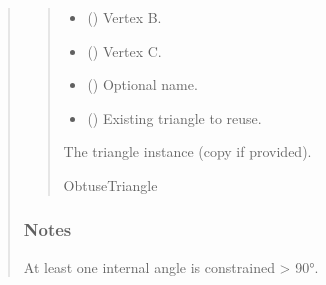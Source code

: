 \documentclass[letterpaper,10pt,english]{sphinxmanual}
\begin{document}
\begin{quote}
\begin{fulllineitems}
\begin{fulllineitems}
\begin{quote}
\begin{description}
\begin{itemize}
\item {} 
\sphinxAtStartPar
{} (\sphinxstyleliteralemphasis{\sphinxupquote{ | }}) \textendash{} Vertex B.

\item {} 
\sphinxAtStartPar
{} (\sphinxstyleliteralemphasis{\sphinxupquote{ | }}) \textendash{} Vertex C.

\item {} 
\sphinxAtStartPar
{} (\sphinxstyleliteralemphasis{\sphinxupquote{ | }}) \textendash{} Optional name.

\item {} 
\sphinxAtStartPar
{} (\sphinxstyleliteralemphasis{\sphinxupquote{ | }}) \textendash{} Existing triangle to reuse.

\end{itemize}

\sphinxAtStartPar
The triangle instance (copy if provided).

\sphinxAtStartPar
ObtuseTriangle

\end{description}\end{quote}
\subsubsection*{Notes}

\sphinxAtStartPar
At least one internal angle is constrained \textgreater{} 90°.

\end{fulllineitems}



\end{fulllineitems}
\end{quote}
\end{document}

